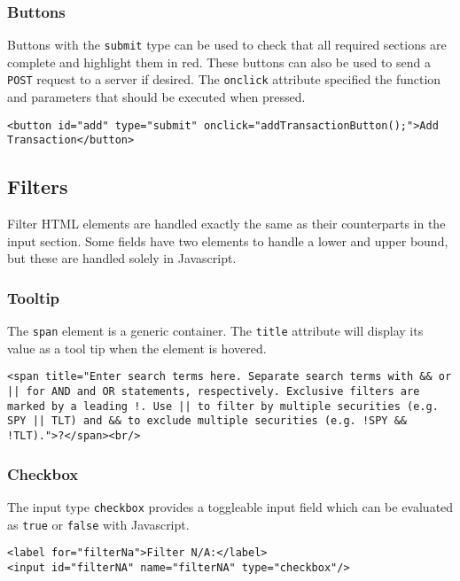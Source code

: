 \documentclass[letterpaper]{article}
\begin{document}
\subsubsection{Buttons}

Buttons with the \lstinline{submit} type can be used to check that all required sections are complete and highlight them in red.
These buttons can also be used to send a \lstinline{POST} request to a server if desired.
The \lstinline{onclick} attribute specified the function and parameters that should be executed when pressed.
\begin{lstlisting}[firstnumber=70]
<button id="add" type="submit" onclick="addTransactionButton();">Add Transaction</button>
\end{lstlisting}

\subsection{Filters}

Filter HTML elements are handled exactly the same as their counterparts in the input section.
Some fields have two elements to handle a lower and upper bound, but these are handled solely in Javascript.

\subsubsection{Tooltip}

The \lstinline{span} element is a generic container.
The \lstinline{title} attribute will display its value as a tool tip when the element is hovered.
\begin{lstlisting}[firstnumber=118]
<span title="Enter search terms here. Separate search terms with && or || for AND and OR statements, respectively. Exclusive filters are marked by a leading !. Use || to filter by multiple securities (e.g. SPY || TLT) and && to exclude multiple securities (e.g. !SPY && !TLT).">?</span><br/>
\end{lstlisting}

\subsubsection{Checkbox}

The input type \lstinline{checkbox} provides a toggleable input field which can be evaluated as \lstinline{true} or \lstinline{false} with Javascript.
\begin{lstlisting}[firstnumber=153]
<label for="filterNa">Filter N/A:</label>
<input id="filterNA" name="filterNA" type="checkbox"/>
\end{lstlisting}
\end{document}
